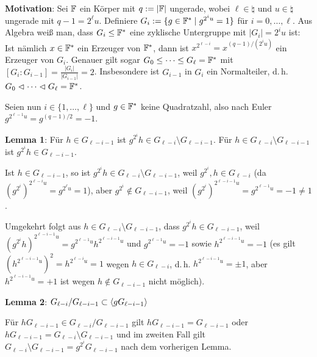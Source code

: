 \textbf{Motivation}:
Sei $\mathbb{F}$ ein Körper mit $q := |\mathbb{F}|$ ungerade,
wobei $\ell \in \natural$ und $u \in \natural$ ungerade mit $q - 1 = 2^\ell u$.
Definiere $G_i := \{g \in \mathbb{F}^\ast \;|\; g^{2^i u} = 1\}$
für $i = 0, \dotsc, \ell$.
Aus Algebra weiß man, dass $G_i \le \mathbb{F}^\ast$ eine zyklische Untergruppe
mit $|G_i| = 2^i u$ ist:
Ist nämlich $x \in \mathbb{F}^\ast$ ein Erzeuger von $\mathbb{F}^\ast$, dann ist
$x^{2^{\ell-i}} = x^{(q-1)/(2^i u)}$ ein Erzeuger von $G_i$.
Genauer gilt sogar $G_0 \le \dotsb \le G_\ell = \mathbb{F}^\ast$ mit
$[G_i : G_{i-1}] = \frac{|G_i|}{|G_{i-1}|} = 2$.
Insbesondere ist $G_{i-1}$ in $G_i$ ein Normalteiler, d.\,h.
$G_0 \vartriangleleft \dotsb \vartriangleleft G_\ell = \mathbb{F}^\ast$.

\linie

Seien nun $i \in \{1, \dotsc, \ell\}$ und
$g \in \mathbb{F}^\ast$ keine Quadratzahl, also nach Euler $g^{2^{\ell-1}u} = g^{(q-1)/2} = -1$.

\textbf{Lemma 1}:
Für $h \in G_{\ell-i-1}$ ist $g^{2^i} h \in G_{\ell-i} \setminus G_{\ell-i-1}$.
Für $h \in G_{\ell-i} \setminus G_{\ell-i-1}$ ist $g^{2^i} h \in G_{\ell-i-1}$.

\begin{Beweis}
    Ist $h \in G_{\ell-i-1}$, so ist $g^{2^i} h \in G_{\ell-i} \setminus G_{\ell-i-1}$,
    weil $g^{2^i}, h \in G_{\ell-i}$
    (da $(g^{2^i})^{2^{\ell-i} u} = g^{2^\ell u} = 1$),
    aber $g^{2^i} \notin G_{\ell-i-1}$,
    weil $(g^{2^i})^{2^{\ell-i-1} u} = g^{2^{\ell-1} u} = -1 \not= 1$.
    
    Umgekehrt folgt aus $h \in G_{\ell-i} \setminus G_{\ell-i-1}$,
    dass $g^{2^i} h \in G_{\ell-i-1}$,
    weil $(g^{2^i} h)^{2^{\ell-i-1} u} = g^{2^{\ell-1} u} h^{2^{\ell-i-1} u}$
    und $g^{2^{\ell-1} u} = -1$ sowie
    $h^{2^{\ell-i-1} u} = -1$ (es gilt $(h^{2^{\ell-i-1} u})^2 = h^{2^{\ell-i} u} = 1$ wegen
    $h \in G_{\ell-i}$, d.\,h. $h^{2^{\ell-i-1} u} = \pm 1$,
    aber $h^{2^{\ell-i-1} u} = +1$ ist wegen $h \notin G_{\ell-i-1}$ nicht möglich).
\end{Beweis}

\textbf{Lemma 2}:
$G_{\ell-i}/G_{\ell-i-1} \subset \langle gG_{\ell-i-1}\rangle$

\begin{Beweis}
    Für $hG_{\ell-i-1} \in G_{\ell-i}/G_{\ell-i-1}$ gilt
    $hG_{\ell-i-1} = G_{\ell-i-1}$ oder
    $hG_{\ell-i-1} = G_{\ell-i} \setminus G_{\ell-i-1}$
    und im zweiten Fall gilt $G_{\ell-i} \setminus G_{\ell-i-1} = g^{2^i} G_{\ell-i-1}$
    nach dem vorherigen Lemma.
\end{Beweis}

